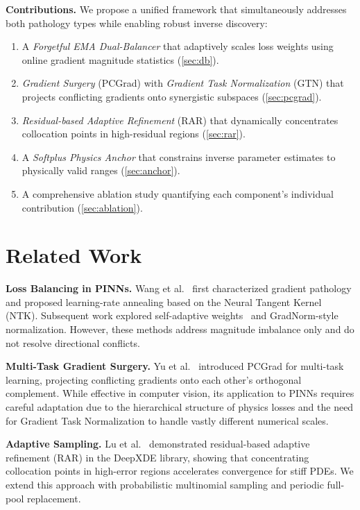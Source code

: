 \documentclass[conference]{IEEEtran}
\begin{document}
\textbf{Contributions.} We propose a unified framework that simultaneously addresses both pathology types while enabling robust inverse discovery:
\begin{enumerate}
    \item A \emph{Forgetful EMA Dual-Balancer} that adaptively scales loss weights using online gradient magnitude statistics (\cref{sec:db}).
    \item \emph{Gradient Surgery} (PCGrad) with \emph{Gradient Task Normalization} (GTN) that projects conflicting gradients onto synergistic subspaces (\cref{sec:pcgrad}).
    \item \emph{Residual-based Adaptive Refinement} (RAR) that dynamically concentrates collocation points in high-residual regions (\cref{sec:rar}).
    \item A \emph{Softplus Physics Anchor} that constrains inverse parameter estimates to physically valid ranges (\cref{sec:anchor}).
    \item A comprehensive ablation study quantifying each component's individual contribution (\cref{sec:ablation}).
\end{enumerate}

\section{Related Work}
\label{sec:related}

\textbf{Loss Balancing in PINNs.} Wang et al.~\cite{b4} first characterized gradient pathology and proposed learning-rate annealing based on the Neural Tangent Kernel (NTK). Subsequent work explored self-adaptive weights~\cite{b5} and GradNorm-style normalization. However, these methods address magnitude imbalance only and do not resolve directional conflicts.

\textbf{Multi-Task Gradient Surgery.} Yu et al.~\cite{b3} introduced PCGrad for multi-task learning, projecting conflicting gradients onto each other's orthogonal complement. While effective in computer vision, its application to PINNs requires careful adaptation due to the hierarchical structure of physics losses and the need for Gradient Task Normalization to handle vastly different numerical scales.

\textbf{Adaptive Sampling.} Lu et al.~\cite{b2} demonstrated residual-based adaptive refinement (RAR) in the DeepXDE library, showing that concentrating collocation points in high-error regions accelerates convergence for stiff PDEs. We extend this approach with probabilistic multinomial sampling and periodic full-pool replacement.
\end{document}
